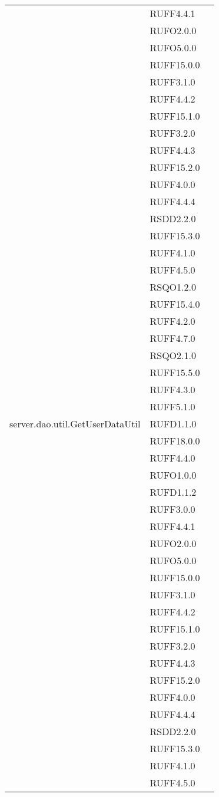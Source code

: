 \begin{center}
\begin{longtable}{lp{}l}
 & RUFF4.4.1 \\
 & RUFO2.0.0 \\
 & RUFO5.0.0 \\
 & RUFF15.0.0 \\
 & RUFF3.1.0 \\
 & RUFF4.4.2 \\
 & RUFF15.1.0 \\
 & RUFF3.2.0 \\
 & RUFF4.4.3 \\
 & RUFF15.2.0 \\
 & RUFF4.0.0 \\
 & RUFF4.4.4 \\
 & RSDD2.2.0 \\
 & RUFF15.3.0 \\
 & RUFF4.1.0 \\
 & RUFF4.5.0 \\
 & RSQO1.2.0 \\
 & RUFF15.4.0 \\
 & RUFF4.2.0 \\
 & RUFF4.7.0 \\
 & RSQO2.1.0 \\
 & RUFF15.5.0 \\
 & RUFF4.3.0 \\
 & RUFF5.1.0 \\
server.dao.util.GetUserDataUtil & RUFD1.1.0 \\
 & RUFF18.0.0 \\
 & RUFF4.4.0 \\
 & RUFO1.0.0 \\
 & RUFD1.1.2 \\
 & RUFF3.0.0 \\
 & RUFF4.4.1 \\
 & RUFO2.0.0 \\
 & RUFO5.0.0 \\
 & RUFF15.0.0 \\
 & RUFF3.1.0 \\
 & RUFF4.4.2 \\
 & RUFF15.1.0 \\
 & RUFF3.2.0 \\
 & RUFF4.4.3 \\
 & RUFF15.2.0 \\
 & RUFF4.0.0 \\
 & RUFF4.4.4 \\
 & RSDD2.2.0 \\
 & RUFF15.3.0 \\
 & RUFF4.1.0 \\
 & RUFF4.5.0 \\

\end{longtable}
\end{center}
